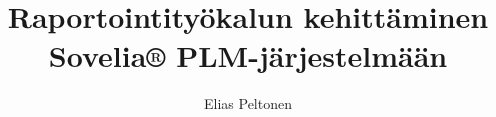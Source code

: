 \documentclass[language=finnish,version=final,mainfont=none,sharelatex=false]{utuftthesis}
\providecommand{\algorithmname}{Algoritmi}
\begin{document}
\title{Raportointityökalun kehittäminen Sovelia® PLM-järjestelmään}
\author{Elias Peltonen}

\maketitle


\tableofcontents


\listoftables

\listofacronyms

\renewcommand{\algorithmname}{\listingscaption}


\begin{comment}
To better organize things, create a new tex file for each chapter
and input it below.

Avoid using the å, ä, ö or <space> characters in referred names and
underscores \_ in file names (may break hyperref).

Good luck! Thanks.
\end{comment}





%
%


\printbibliography

\begin{comment}
Important! Create the appendix chapters with command \textbackslash appchapter\{some
name\} instead of \textbackslash chapter\{some name\} for the automagic
page counting to work!
\end{comment}


\end{document}
